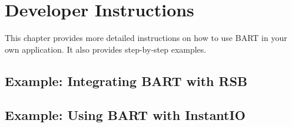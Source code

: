 \chapter{Developer Instructions}

This chapter provides more detailed instructions on how to use BART in your own application. It also provides step-by-step examples.


\section{Example: Integrating BART with RSB}

\section{Example: Using BART with InstantIO}
